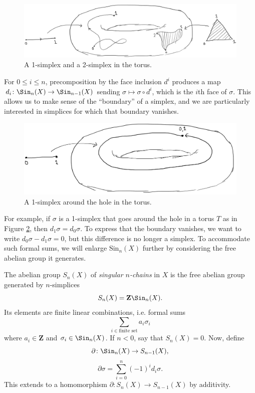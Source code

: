 \begin{figure}[H]
	\centering
	\includegraphics[width=\linewidth]{assets/L01/01-simplices-on-torus}
	\caption{A 1-simplex and a 2-simplex in the torus.}
	\label{fig:01-simplices-on-torus}
\end{figure}

For $0\leq i \leq n$, precomposition by the face inclusion $d^i$ produces a map $d_i\colon \Sin_n(X)\to\Sin_{n-1}(X)$ sending $\sigma\mapsto\sigma\circ d^i$, which is the $i$th face of $\sigma$. This allows us to make sense of the ``boundary'' of a simplex, and we are particularly interested in simplices for which that boundary vanishes.
\begin{figure}
	\centering
	\includegraphics[width=0.7\linewidth]{assets/L01/01-torus-simplex-around-hole}
	\caption{A 1-simplex around the hole in the torus.}
	\label{fig:01-torus-simplex-around-hole}
\end{figure}
For example, if $\sigma$ is a 1-simplex that goes around the hole in a torus $T$ as in Figure \ref{fig:01-torus-simplex-around-hole}, then $d_1\sigma = d_0\sigma$. To express that the boundary vanishes, we want to write $d_0\sigma - d_1\sigma=0$, but this difference is no longer a simplex. To accommodate such formal sums, we will enlarge $\mathrm{Sin}_n(X)$ further by considering the free abelian group it generates.
\begin{definition}
The abelian group $S_n(X)$ of \emph{singular $n$-chains} in $X$ is the free abelian group generated by $n$-simplices
$$S_n(X) = \mathbf{Z}\Sin_n(X).$$
    Its elements are finite linear combinations, i.e. formal sums
    $$\sum_{i\in\text{finite set}}a_i\sigma_i$$
    where $a_i\in\mathbf{Z}$ and $\sigma_i \in \Sin_n(X)$. If $n<0$, say that $S_n(X)=0$. Now, define
$$\partial\colon \Sin_n(X)\to S_{n-1}(X),$$
$$\partial\sigma = \sum_{i=0}^n(-1)^i d_i\sigma.$$
This extends to a homomorphism $\partial \colon S_n(X) \to S_{n-1}(X)$ by additivity.
\end{definition}
